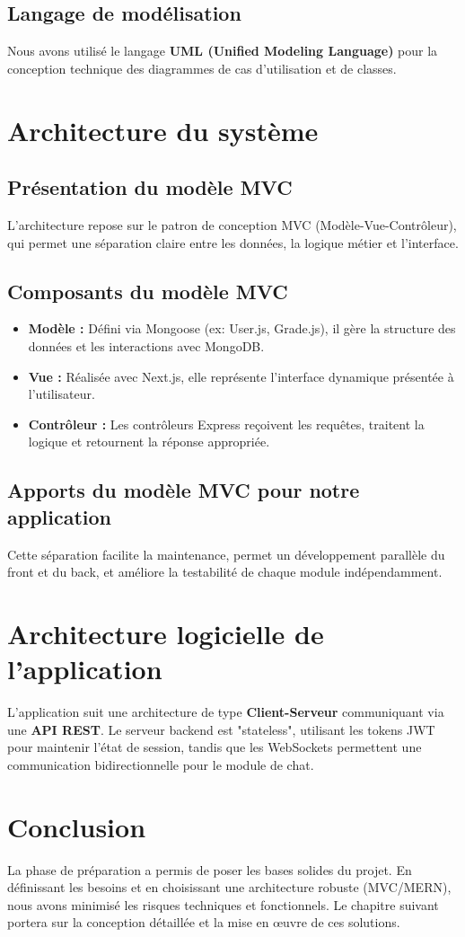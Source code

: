 \subsection{Langage de modélisation}
Nous avons utilisé le langage \textbf{UML (Unified Modeling Language)} pour la conception technique des diagrammes de cas d'utilisation et de classes.

\section{Architecture du système}

\subsection{Présentation du modèle MVC}
L'architecture repose sur le patron de conception MVC (Modèle-Vue-Contrôleur), qui permet une séparation claire entre les données, la logique métier et l'interface.

\subsection{Composants du modèle MVC}
\begin{itemize}
    \item \textbf{Modèle :} Défini via Mongoose (ex: User.js, Grade.js), il gère la structure des données et les interactions avec MongoDB.
    \item \textbf{Vue :} Réalisée avec Next.js, elle représente l'interface dynamique présentée à l'utilisateur.
    \item \textbf{Contrôleur :} Les contrôleurs Express reçoivent les requêtes, traitent la logique et retournent la réponse appropriée.
\end{itemize}

\subsection{Apports du modèle MVC pour notre application}
Cette séparation facilite la maintenance, permet un développement parallèle du front et du back, et améliore la testabilité de chaque module indépendamment.

\section{Architecture logicielle de l’application}
L'application suit une architecture de type \textbf{Client-Serveur} communiquant via une \textbf{API REST}. Le serveur backend est "stateless", utilisant les tokens JWT pour maintenir l'état de session, tandis que les WebSockets permettent une communication bidirectionnelle pour le module de chat.

\section{Conclusion}
La phase de préparation a permis de poser les bases solides du projet. En définissant les besoins et en choisissant une architecture robuste (MVC/MERN), nous avons minimisé les risques techniques et fonctionnels. Le chapitre suivant portera sur la conception détaillée et la mise en œuvre de ces solutions.
